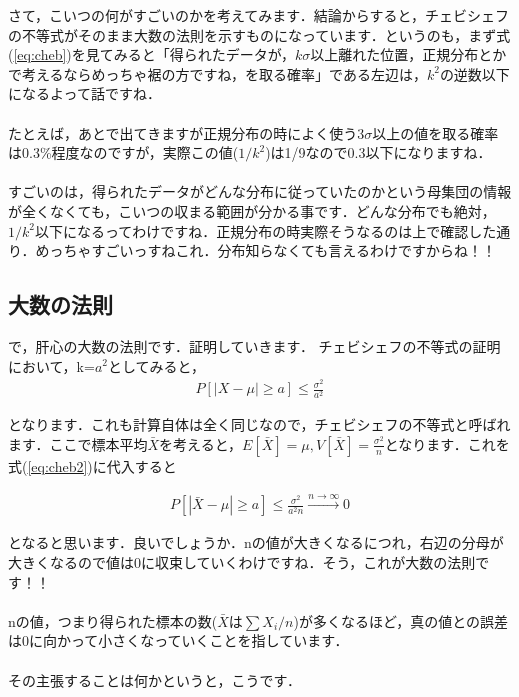 \documentclass[11pt,a4paper,uplatex]{ujreport} 	%
\begin{document}
さて，こいつの何がすごいのかを考えてみます．結論からすると，チェビシェフの不等式がそのまま大数の法則を示すものになっています．というのも，まず式(\ref{eq:cheb})を見てみると「得られたデータが，$k\sigma$以上離れた位置，正規分布とかで考えるならめっちゃ裾の方ですね，を取る確率」である左辺は，$k^2$の逆数以下になるよって話ですね．\\
\\

たとえば，あとで出てきますが正規分布の時によく使う$3\sigma$以上の値を取る確率は0.3\%程度なのですが，実際この値($1/k^2$)は1/9なので0.3以下になりますね．\\
\\

すごいのは，得られたデータがどんな分布に従っていたのかという母集団の情報が全くなくても，こいつの収まる範囲が分かる事です．どんな分布でも絶対，$1/k^2$以下になるってわけですね．正規分布の時実際そうなるのは上で確認した通り．めっちゃすごいっすねこれ．分布知らなくても言えるわけですからね！！

\subsection{大数の法則}
で，肝心の大数の法則です．証明していきます．
チェビシェフの不等式の証明において，k=$a^2$としてみると，
\begin{align}
  P[|X-\mu| \geq a] \leq \frac{\sigma^2}{a^2}
  \label{eq:cheb2}
\end{align}

となります．これも計算自体は全く同じなので，チェビシェフの不等式と呼ばれます．ここで標本平均$\bar{X}$を考えると，$E[\bar{X}] = \mu, V[\bar{X}] = \frac{\sigma^2}{n}$となります．これを式(\ref{eq:cheb2})に代入すると

\begin{align}
  P[|\bar{X}-\mu|\geq a] \leq \frac{\sigma^2}{a^2n}　\xrightarrow{n\rightarrow\infty}0
\end{align}

となると思います．良いでしょうか．nの値が大きくなるにつれ，右辺の分母が大きくなるので値は0に収束していくわけですね．そう，これが大数の法則です！！\\
\\

nの値，つまり得られた標本の数($\bar{X}は\sum X_i/n$)が多くなるほど，真の値との誤差は0に向かって小さくなっていくことを指しています．\\\\

その主張することは何かというと，こうです．\\
\end{document}
